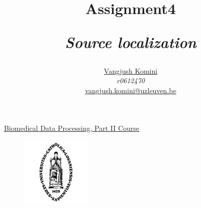 \documentclass[a4paper]{article}
\title{Assignment4\\\centerline{\textit{Source localization}} }
\author{
\href{mailto:vangjush.komini@uzleuven.be}{Vangjush Komini}\\  \textit{r0612470} \\
\href{mailto:vangjush.komini@uzleuven.be}{vangjush.komini@uzleuven.be}\\
}
\numberwithin{equation}{subsection}
\numberwithin{figure}{subsection}
\begin{document}
\maketitle
\begin{center}
\Large \href{https://onderwijsaanbod.kuleuven.be/syllabi/e/H06W1AE.htm#activetab=doelstellingen_idp41200}{Biomedical Data Processing, Part II Course}
\end{center}

\begin{figure}[!htbp]
\centering
\includegraphics[width=0.3\textwidth]{icon2.png}
\end{figure}




\clearpage




\clearpage
\appendix




\end{document}
